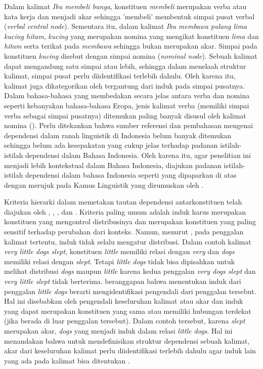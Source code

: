Dalam kalimat \textit{Ibu membeli bunga}, konstituen \textit{membeli} merupakan verba atau kata kerja dan menjadi akar sehingga 'membeli' membentuk simpai pusat verbal (\textit{verbal central node}). Sementara itu, dalam kalimat \textit{Ibu membawa pulang lima kucing hitam}, \textit{kucing} yang merupakan nomina yang mengikat konstituen \textit{lima} dan \textit{hitam} serta terikat pada \textit{membawa} sehingga bukan merupakan akar. Simpai pada konstituen \textit{kucing} disebut dengan simpai nomina (\textit{nominal node}). Sebuah kalimat dapat mengandung satu simpai atau lebih, sehingga dalam menelaah struktur kalimat, simpai pusat perlu diidentifikasi terlebih dahulu. Oleh karena itu, kalimat juga dikategorikan oleh \cite{tesniere1959elements} tergantung dari induk pada simpai pusatnya. Dalam bahasa-bahasa yang membedakan secara jelas antara verba dan nomina seperti kebanyakan bahasa-bahasa Eropa, jenis kalimat verba (memiliki simpai verba sebagai simpai pusatnya) ditemukan paling banyak disusul oleh kalimat nomina (\citealp{tesniere1959elements, hudson2007language}). Perlu ditekankan bahwa sumber referensi dan pembahasan mengenai dependensi dalam ranah linguistik di Indonesia belum banyak ditemukan sehingga belum ada kesepakatan yang cukup jelas terhadap padanan istilah-istilah dependensi dalam Bahasa Indonesia. Oleh karena itu, agar penelitian ini menjadi lebih kontekstual dalam Bahasa Indonesia, diajukan padanan istilah-istilah dependensi dalam bahasa Indonesia seperti yang dipaparkan di atas dengan merujuk pada Kamus Linguistik yang dirumuskan oleh \cite{kridalaksana2008kamus}.

Kriteria hierarki dalam memetakan tautan dependensi antarkonstituen telah diajukan oleh \cite{bloomfield1933language}, \cite{zwicky1985heads}, \cite{garde1977ordre}, dan \cite{mel'vcuk1988dependency}. Kriteria paling umum adalah induk harus merupakan konstituen yang mengontrol distribusinya dan merupakan konstituen yang paling sensitif terhadap perubahan dari konteks. Namun, menurut \cite{gerdes2013defining}, pada penggalan kalimat tertentu, induk tidak selalu mengatur distribusi. Dalam contoh kalimat \textit{very little dogs slept}, konstituen \textit{little} memiliki relasi dengan \textit{very} dan \textit{dogs} memiliki relasi dengan \textit{slept}. Tetapi \textit{little dogs} tidak bisa dipisahkan untuk melihat distribusi \textit{dogs} maupun \textit{little} karena kedua penggalan \textit{very dogs slept} dan \textit{very little slept} tidak berterima. \cite{gerdes2013defining} beranggapan bahwa menentukan induk dari penggalan \textit{little dogs} berarti mengidentifikasi pengendali dari penggalan tersebut. Hal ini  disebabkan oleh pengendali keseluruhan kalimat atau akar dan induk yang dapat merupakan konstituen yang sama atau memiliki hubungan terdekat (jika berada di luar penggalan tersebut). Dalam contoh tersebut, karena \textit{slept} merupakan akar, \textit{dogs} yang menjadi induk dalam relasi \textit{little dogs}. Hal ini menandakan bahwa untuk mendefinisikan struktur dependensi sebuah kalimat, akar dari keseluruhan kalimat perlu diidentifikasi terlebih dahulu agar induk lain yang ada pada kalimat bisa ditentukan \citep{gerdes2013defining}. 


